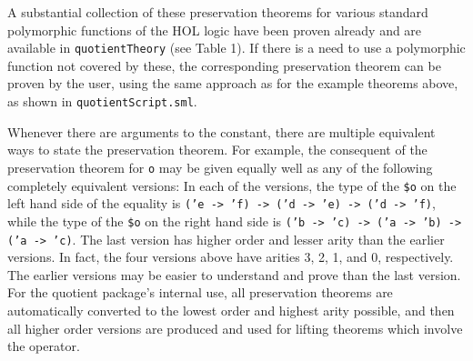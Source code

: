 \documentclass[envcountsame,runningheads]{llncs}
\begin{document}
A substantial collection of these
preservation
theorems for various
standard polymorphic functions of the HOL logic have been proven already and
are available in {\tt quotientTheory} (see Table 1). 
If there is a need to use a
polymorphic function not covered by these, the corresponding
preservation
theorem can be proven by the user, using the same approach as for the example
theorems above, as shown in {\tt quotientScript.sml}.

Whenever there are arguments to the constant, there are
multiple equivalent ways to state the
preservation
theorem.
For example, the consequent of the
preservation
theorem for {\tt o}
may be given
equally well as any of the following completely equivalent versions:
In each of the versions, the type of the {\tt \$o} on the left hand side
of the equality
is {\tt ('e -> 'f) -> ('d -> 'e) -> ('d -> 'f)},
while the type of the {\tt \$o} on the right hand side
is {\tt ('b -> 'c) -> ('a -> 'b) -> ('a -> 'c)}.
The last version has higher order and lesser arity than the
earlier versions.  In fact, the four versions above have arities
3, 2, 1, and 0, respectively.
The earlier versions may be easier to understand and prove than the
last version. 
For the quotient package's internal use, all preservation
theorems are automatically converted to the lowest order and highest
arity possible, and then all higher order versions are produced
and used for lifting theorems
which involve the operator.
\end{document}
